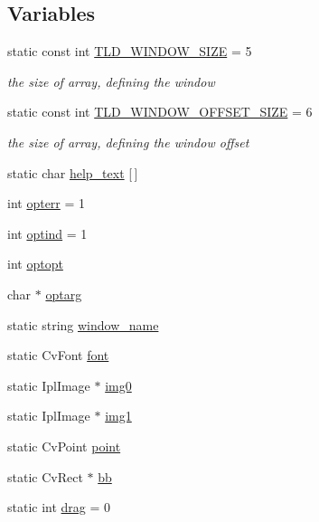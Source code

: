 \subsection*{Variables}
\begin{DoxyCompactItemize}
\item 
static const int \hyperlink{namespacetld_ad0458a97a7973a088840e7917515c6ae}{T\-L\-D\-\_\-\-W\-I\-N\-D\-O\-W\-\_\-\-S\-I\-Z\-E} = 5
\begin{DoxyCompactList}\small\item\em the size of array, defining the window \end{DoxyCompactList}\item 
static const int \hyperlink{namespacetld_a7a647c1eaeda30086f4519b611db4e71}{T\-L\-D\-\_\-\-W\-I\-N\-D\-O\-W\-\_\-\-O\-F\-F\-S\-E\-T\-\_\-\-S\-I\-Z\-E} = 6
\begin{DoxyCompactList}\small\item\em the size of array, defining the window offset \end{DoxyCompactList}\item 
static char \hyperlink{namespacetld_a17f0b1eb181c0395a541e031b203040a}{help\-\_\-text} \mbox{[}$\,$\mbox{]}
\item 
int \hyperlink{namespacetld_a6e180d5067af278cc277ae9c6f7507c1}{opterr} = 1
\item 
int \hyperlink{namespacetld_ab8c5a378ef03678c537edc84a15abc22}{optind} = 1
\item 
int \hyperlink{namespacetld_a6d6bd80732b9f396bc03e5f2c5cf30f8}{optopt}
\item 
char $\ast$ \hyperlink{namespacetld_a1bbc7d3201a2ef41da5495e0e48cfd2e}{optarg}
\item 
static string \hyperlink{namespacetld_ad1bfc03770cc333da8a972ab7d35c246}{window\-\_\-name}
\item 
static Cv\-Font \hyperlink{namespacetld_a16a44df30fb791b45dd103ba1541fb67}{font}
\item 
static Ipl\-Image $\ast$ \hyperlink{namespacetld_a32bc4295eda098201cd336e2d2f1e217}{img0}
\item 
static Ipl\-Image $\ast$ \hyperlink{namespacetld_ac832a3e8122e594c1c5321935cbc2639}{img1}
\item 
static Cv\-Point \hyperlink{namespacetld_a680868c3e5a47352c5353897519636d4}{point}
\item 
static Cv\-Rect $\ast$ \hyperlink{namespacetld_aa5e13bbb9a53d3e9103d430b6113b08b}{bb}
\item 
static int \hyperlink{namespacetld_a7cfa165f34457693b8898cfa78e51945}{drag} = 0
\end{DoxyCompactItemize}


